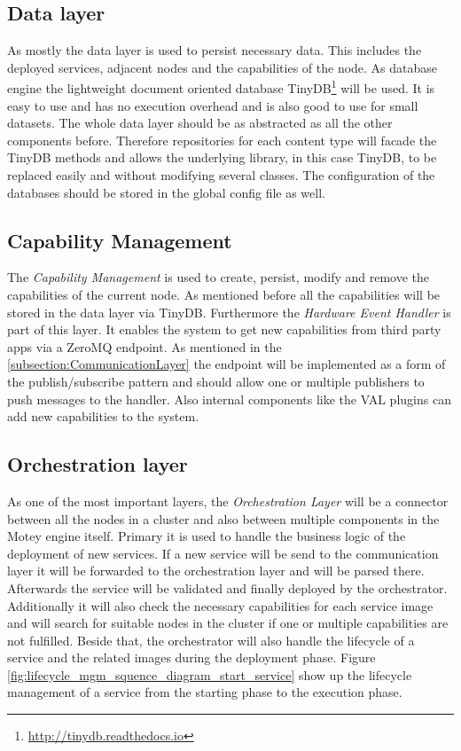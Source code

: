 \subsection{Data layer}
As mostly the data layer is used to persist necessary data.
This includes the deployed services, adjacent nodes and the capabilities of the node.
As database engine the lightweight document oriented database TinyDB\footnote{\url{http://tinydb.readthedocs.io}} will be used.
It is easy to use and has no execution overhead and is also good to use for small datasets.
The whole data layer should be as abstracted as all the other components before.
Therefore repositories for each content type will facade the TinyDB methods and allows the underlying library, in this case TinyDB, to be replaced easily and
without modifying several classes.
The configuration of the databases should be stored in the global config file as well.


\subsection{Capability Management}
The \textit{Capability Management} is used to create, persist, modify and remove the capabilities of the current node.
As mentioned before all the capabilities will be stored in the data layer via TinyDB.
Furthermore the \textit{Hardware Event Handler} is part of this layer.
It enables the system to get new capabilities from third party apps via a ZeroMQ endpoint.
As mentioned in the \ref{subsection:CommunicationLayer} the endpoint will be implemented as a form of the publish/subscribe pattern and should allow one or multiple publishers to push messages to the handler.
Also internal components like the \ac{VAL} plugins can add new capabilities to the system.


\subsection{Orchestration layer}
As one of the most important layers, the \textit{Orchestration Layer} will be a connector between all the nodes in a cluster and also between multiple components in the Motey engine itself.
Primary it is used to handle the business logic of the deployment of new services.
If a new service will be send to the communication layer it will be forwarded to the orchestration layer and will be parsed there.
Afterwards the service will be validated and finally deployed by the orchestrator.
Additionally it will also check the necessary capabilities for each service image and will search for suitable nodes in the cluster if one or multiple capabilities are not fulfilled.
Beside that, the orchestrator will also handle the lifecycle of a service and the related images during the deployment phase.
Figure \ref{fig:lifecycle_mgm_squence_diagram_start_service} show up the lifecycle management of a service from the starting phase to the execution phase.

